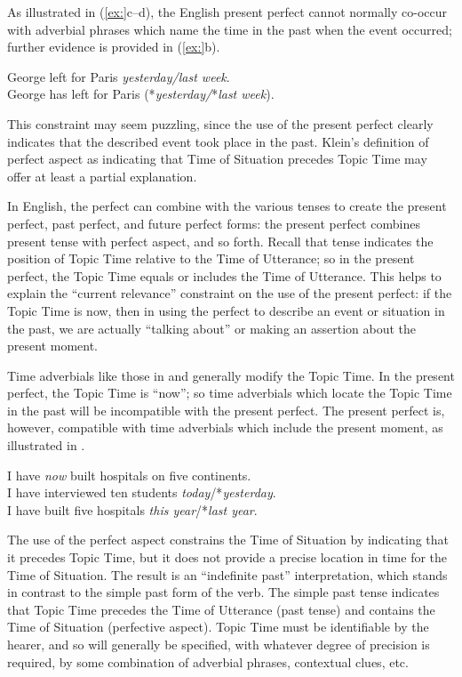 As illustrated in (\ref{ex:}c--d), the English present perfect cannot normally co-occur with adverbial phrases which name the time in the past when the event occurred; further evidence is provided in (\ref{ex:}b).


\ea
\ea George left for Paris \textit{yesterday/last week}.\\
\ex George has left for Paris (*\textit{yesterday/}*\textit{last week}).
                       \z
\z


This constraint may seem puzzling, since the use of the present perfect clearly indicates that the described event took place in the past. Klein’s definition of perfect aspect as indicating that Time of Situation precedes Topic Time may offer at least a partial explanation. 



In English, the perfect can combine with the various tenses to create the present perfect, past perfect, and future perfect forms: the present perfect combines present tense with perfect aspect, and so forth. Recall that tense indicates the position of Topic Time relative to the Time of Utterance; so in the present perfect, the Topic Time equals or includes the Time of Utterance. This helps to explain the “current relevance” constraint on the use of the present perfect: if the Topic Time is now, then in using the perfect to describe an event or situation in the past, we are actually “talking about” or making an assertion about the present moment.



Time adverbials like those in  and  generally modify the Topic Time. In the present perfect, the Topic Time is “now”; so time adverbials which locate the Topic Time in the past will be incompatible with the present perfect. The present perfect is, however, compatible with time adverbials which include the present moment, as illustrated in .


\ea
\ea I have \textit{now} built hospitals on five continents.\\
\ex I have interviewed ten students \textit{today}/*\textit{yesterday}.\\
\ex I have built five hospitals \textit{this year}/*\textit{last year}.
                       \z
\z


The use of the perfect aspect constrains the Time of Situation by indicating that it precedes Topic Time, but it does not provide a precise location in time for the Time of Situation. The result is an “indefinite past” interpretation, which stands in contrast to the simple past form of the verb. The simple past tense indicates that Topic Time precedes the Time of Utterance (past tense) and contains the Time of Situation (perfective aspect). Topic Time must be identifiable by the hearer, and so will generally be specified, with whatever degree of precision is required, by some combination of adverbial phrases, contextual clues, etc.



